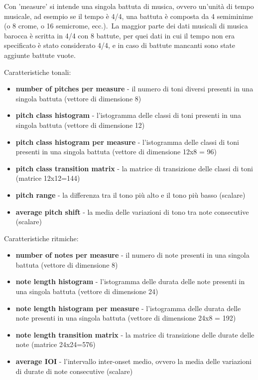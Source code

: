 Con 'measure' si intende una singola battuta di musica, ovvero un'unità di tempo musicale, ad esempio se il tempo è 4/4, una battuta è composta da 4 semiminime (o 8 crome, o 16 semicrome, ecc.).\
La maggior parte dei dati musicali di musica barocca è scritta in 4/4 con 8 battute, per quei dati in cui il tempo non era specificato è stato considerato 4/4, e in caso di battute mancanti sono state aggiunte battute vuote.\

Caratteristiche tonali:
\begin{itemize}
    \item \textbf{number of pitches per measure} - il numero di toni diversi presenti in una singola battuta (vettore di dimensione 8)
    \item \textbf{pitch class histogram} - l'istogramma delle classi di toni presenti in una singola battuta (vettore di dimensione 12)
    \item \textbf{pitch class histogram per measure} - l'istogramma delle classi di toni presenti in una singola battuta (vettore di dimensione 12x8 = 96)
    \item \textbf{pitch class transition matrix} - la matrice di transizione delle classi di toni (matrice 12x12=144)
    \item \textbf{pitch range} - la differenza tra il tono più alto e il tono più basso (scalare)
    \item \textbf{average pitch shift} - la media delle variazioni di tono tra note consecutive (scalare)
\end{itemize}

Caratteristiche ritmiche:
\begin{itemize}
    \item \textbf{number of notes per measure} - il numero di note presenti in una singola battuta (vettore di dimensione 8)
    \item \textbf{note length histogram} - l'istogramma delle durata delle note presenti in una singola battuta (vettore di dimensione 24)
    \item \textbf{note length histogram per measure} - l'istogramma delle durata delle note presenti in una singola battuta (vettore di dimensione 24x8 = 192)
    \item \textbf{note length transition matrix} - la matrice di transizione delle durate delle note (matrice 24x24=576)
    \item \textbf{average IOI} - l'intervallo inter-onset medio, ovvero la media delle variazioni di durate di note consecutive (scalare)
\end{itemize}

